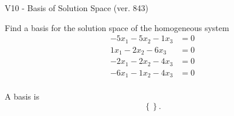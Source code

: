 \begin{exercise}
  \begin{exerciseTitle}V10 - Basis of Solution Space (ver. 843)\end{exerciseTitle}
  \begin{exerciseStatement}
    Find a basis for the solution space of the homogeneous system 
\begin{align*}
 -5 x_ 1 -5 x_ 2 -1 x_ 3 &= 0  \\ 
  1 x_ 1 -2 x_ 2 -6 x_ 3 &= 0  \\ 
  -2 x_ 1 -2 x_ 2 -4 x_ 3 &= 0  \\ 
  -6 x_ 1 -1 x_ 2 -4 x_ 3 &= 0  \\ 
 \end{align*}


 
  \end{exerciseStatement}

  \begin{exerciseAnswer}
   A basis is   
\[\left\{\right\}.\]

  


  \end{exerciseAnswer}
\end{exercise}